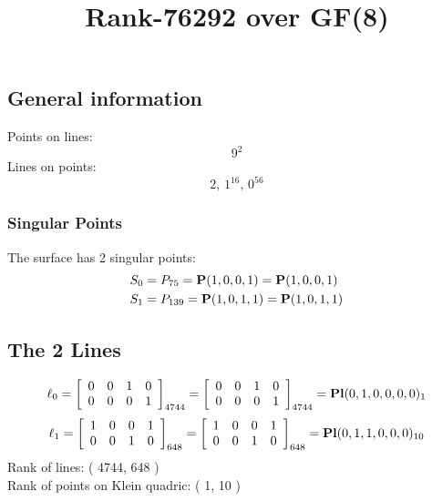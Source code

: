 \documentclass{article}
\newcommand\setTBstruts{\def\T{\rule{0pt}{2.6ex}}%
\def\B{\rule[-1.2ex]{0pt}{0pt}}}
\newcommand{\bP}{{\bf P}}
\begin{document}
 
\setTBstruts



{\allowdisplaybreaks%






\title{Rank-76292 over GF(8)}
\author{}%
\maketitle%
%
{}



\subsection*{General information}
Points on lines:
$$
9^2$$
Lines on points:
$$
2,\,1^{16},\,0^{56}$$
\subsubsection*{Singular Points}
The surface has 2 singular points:\\
\begin{align*}
S_{0} &= P_{75}=\bP(1, 0, 0, 1) = \bP(1, 0, 0, 1)\\
S_{1} &= P_{139}=\bP(1, 0, 1, 1) = \bP(1, 0, 1, 1)\\
\end{align*}
\subsection*{The 2 Lines}
$$
\ell_{0} = 
\left[
\begin{array}{*{4}{r}}
0 & 0 & 1 & 0\\
0 & 0 & 0 & 1\\
\end{array}
\right]
_{4744}
=
\left[
\begin{array}{*{4}c}
0  & 0  & 1  & 0\\
0  & 0  & 0  & 1\\
\end{array}
\right]_{4744}
={\rm\bf Pl}(0,1,0,0,0,0 )_{1}$$
$$
\ell_{1} = 
\left[
\begin{array}{*{4}{r}}
1 & 0 & 0 & 1\\
0 & 0 & 1 & 0\\
\end{array}
\right]
_{648}
=
\left[
\begin{array}{*{4}c}
1  & 0  & 0  & 1\\
0  & 0  & 1  & 0\\
\end{array}
\right]_{648}
={\rm\bf Pl}(0,1,1,0,0,0 )_{10}$$
Rank of lines: ( 4744, 648 )\\
Rank of points on Klein quadric: ( 1, 10 )\\
}
\end{document}
